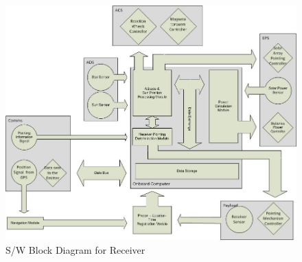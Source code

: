 \begin{landscape}
\begin{figure}[ht!]
\centering
\includegraphics[width=1.3\textheight]{chapters/img/SWBDrec.jpg}
\caption{S/W Block Diagram for Receiver}
\label{SWBDrec}
\end{figure}
\end{landscape}